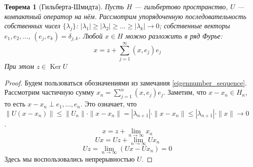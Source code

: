 \documentclass[11pt,openany,a4paper]{scrartcl}
\theoremstyle{plain}
\newtheorem{theorem}{Теорема}[subsection]
\theoremstyle{definition}
\DeclareMathOperator{\Ker}{Ker}
\begin{document}
\begin{theorem}[Гильберта-Шмидта]
    Пусть $H$ — гильбертово пространство, $U$ — компактный оператор на нём. Рассмотрим 
    упорядоченную последовательность собственных чисел $\{\lambda_j\}$:
    $|\lambda_1| \geqslant |\lambda_2| \geqslant \ldots \geqslant |\lambda_k| \to 0$;
    собственные векторы
    $e_1, e_2, \ldots$, $(e_j, e_k) = \delta_{j,k}$. Любой $x\in H$ можно
    разложить в ряд Фурье:
    $$
    x = z + \sum\limits_{j=1}^\infty (x, e_j)e_j
    $$
    При этом $z \in \Ker U$
\end{theorem}
\begin{proof}
    Будем пользоваться обозначениями из замечания \ref{eigennumber_sequence}.
    Рассмотрим частичную сумму $x_n = \sum\limits_{j=1}^n (x, e_j)e_j$. Заметим, что
    $x - x_n \in H_n$, то есть $x - x_n \perp e_1, \ldots, e_n$. Это означает, что
    $\|U(x - x_n)\| \leqslant \|U_n\| \cdot \|x - x_n\| = |\lambda_{n+1}| \cdot \|x - x_n\|
    \leqslant |\lambda_{n+1}|\cdot \|x\| \to 0$.
    $$
    x = z + \lim\limits_{n \to \infty} x_n
    $$
    $$
    Ux = Uz + \lim\limits_{n \to \infty} Ux_n
    $$
    $$
    Uz = \lim\limits_{n \to \infty} (Ux - Ux_n) = 0
    $$
    Здесь мы воспользовались непрерывностью $U$.
\end{proof}
\end{document}
